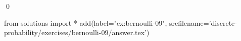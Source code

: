 
\begin{ex} 
  \label{ex:bernoulli-09}
  
  \qed
\end{ex} 
\begin{python0}
from solutions import *
add(label="ex:bernoulli-09",
    srcfilename='discrete-probability/exercises/bernoulli-09/answer.tex') 
\end{python0}
